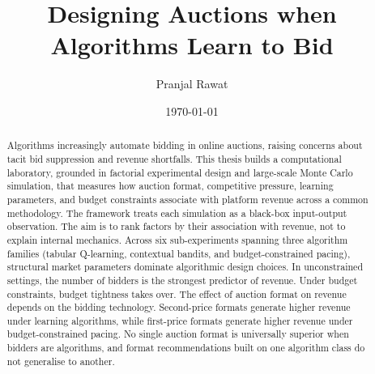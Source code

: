 \documentclass[12pt,oneside]{report}
\title{Designing Auctions when Algorithms Learn to Bid}
\author{Pranjal Rawat}
\date{\today}
\begin{document}
\maketitle

\begin{abstract}
Algorithms increasingly automate bidding in online auctions, raising concerns about tacit bid suppression and revenue shortfalls. This thesis builds a computational laboratory, grounded in factorial experimental design and large-scale Monte Carlo simulation, that measures how auction format, competitive pressure, learning parameters, and budget constraints associate with platform revenue across a common methodology. The framework treats each simulation as a black-box input-output observation. The aim is to rank factors by their association with revenue, not to explain internal mechanics. Across six sub-experiments spanning three algorithm families (tabular Q-learning, contextual bandits, and budget-constrained pacing), structural market parameters dominate algorithmic design choices. In unconstrained settings, the number of bidders is the strongest predictor of revenue. Under budget constraints, budget tightness takes over. The effect of auction format on revenue depends on the bidding technology. Second-price formats generate higher revenue under learning algorithms, while first-price formats generate higher revenue under budget-constrained pacing. No single auction format is universally superior when bidders are algorithms, and format recommendations built on one algorithm class do not generalise to another.
\end{abstract}

\tableofcontents













\appendix



\end{document}
